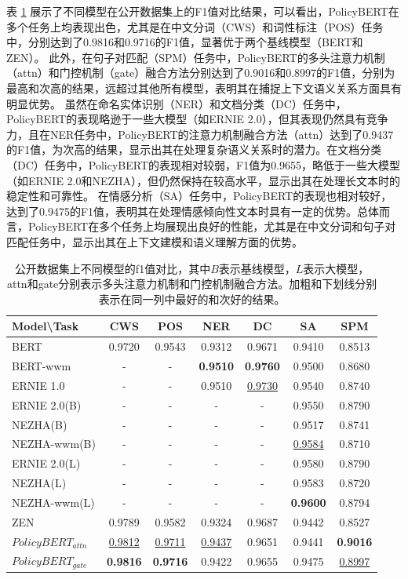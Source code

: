 \documentclass[12pt, a4paper]{ctexart}
\begin{document}
表 \ref{tab:public_results} 展示了不同模型在公开数据集上的F1值对比结果，可以看出，PolicyBERT在多个任务上均表现出色，尤其是在中文分词（CWS）和词性标注（POS）任务中，分别达到了0.9816和0.9716的F1值，显著优于两个基线模型（BERT和ZEN）。
此外，在句子对匹配（SPM）任务中，PolicyBERT的多头注意力机制（attn）和门控机制（gate）融合方法分别达到了0.9016和0.8997的F1值，分别为最高和次高的结果，远超过其他所有模型，表明其在捕捉上下文语义关系方面具有明显优势。
虽然在命名实体识别（NER）和文档分类（DC）任务中，PolicyBERT的表现略逊于一些大模型（如ERNIE 2.0），但其表现仍然具有竞争力，且在NER任务中，PolicyBERT的注意力机制融合方法（attn）达到了0.9437的F1值，为次高的结果，显示出其在处理复杂语义关系时的潜力。在文档分类（DC）任务中，PolicyBERT的表现相对较弱，F1值为0.9655，略低于一些大模型（如ERNIE 2.0和NEZHA），但仍然保持在较高水平，显示出其在处理长文本时的稳定性和可靠性。
在情感分析（SA）任务中，PolicyBERT的表现也相对较好，达到了0.9475的F1值，表明其在处理情感倾向性文本时具有一定的优势。总体而言，PolicyBERT在多个任务上均展现出良好的性能，尤其是在中文分词和句子对匹配任务中，显示出其在上下文建模和语义理解方面的优势。

\begin{table}[H]
    \renewcommand{\arraystretch}{1}
    \centering
    \caption{公开数据集上不同模型的f1值对比，其中$B$表示基线模型，$L$表示大模型，attn和gate分别表示多头注意力机制和门控机制融合方法。加粗和下划线分别表示在同一列中最好的和次好的结果。}
    \begin{tabular}{lcccccc}
        \toprule
        \textbf{Model\textbackslash Task} & CWS & POS & NER & DC & SA & SPM \\
        \midrule
        BERT      & 0.9720 & 0.9543 & 0.9312 & 0.9671 & 0.9410 & 0.8513\\
        \midrule
        BERT-wwm     & - & - & \textbf{0.9510} & \textbf{0.9760} & 0.9500 & 0.8680\\
        ERNIE 1.0    & - & - & 0.9510 & \underline{0.9730} & 0.9540 & 0.8740 \\
        ERNIE 2.0(B) & - & - & -      & -      & 0.9550 & 0.8790\\
        NEZHA(B)     & - & - & -      & -      & 0.9517 & 0.8741\\
        NEZHA-wwm(B) & - & - & -      & -      & \underline{0.9584} & 0.8710\\
        \midrule
        ERNIE 2.0(L) & - & - & -      & -      & 0.9580 & 0.8790\\
        NEZHA(L)     & - & - & -      & -      & 0.9583 & 0.8720\\
        NEZHA-wwm(L) & - & - & -      & -      & \textbf{0.9600} & 0.8794\\
        \midrule
        ZEN       & 0.9789 & 0.9582 & 0.9324 & 0.9687 & 0.9442 & 0.8527\\
        \midrule
        $PolicyBERT_{attn}$ & \underline{0.9812} & \underline{0.9711} & \underline{0.9437} & 0.9651 & 0.9441 & \textbf{0.9016}\\
        $PolicyBERT_{gate}$ & \textbf{0.9816} & \textbf{0.9716} & 0.9422 & 0.9655 & 0.9475 & \underline{0.8997}\\ 
        \bottomrule
    \end{tabular}
    \label{tab:public_results} 
\end{table}
\end{document}
